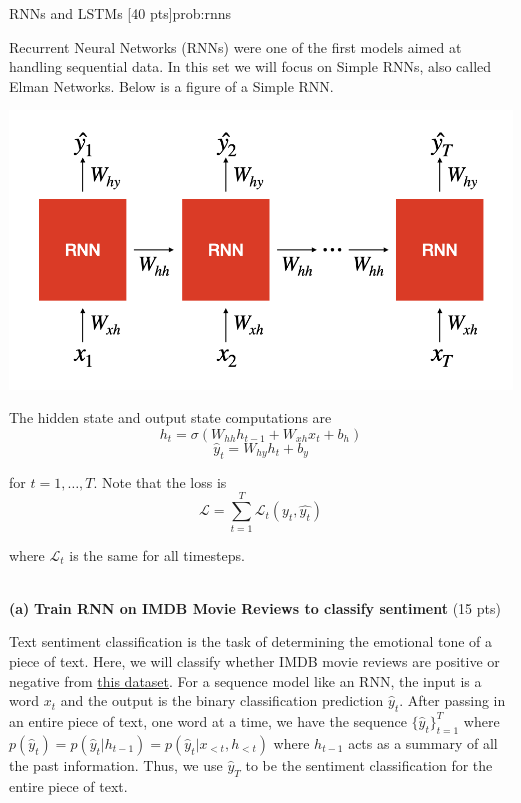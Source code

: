 
\begin{problem}{RNNs and LSTMs \hfill [40 pts]}{prob:rnns}
\label{prob:rnns}

Recurrent Neural Networks (RNNs) were one of the first models aimed at handling sequential data. In this set we will focus on Simple RNNs, also called Elman Networks. Below is a figure of a Simple RNN.

\begin{center}
    \includegraphics[width=0.75\linewidth]{media/rnnfig2.001.png}
\end{center}
    
The hidden state and output state computations are
$$h_t=\sigma(W_{hh}h_{t-1} + W_{xh}x_t + b_h)$$
$$\hat{y}_t = W_{hy}h_t + b_y$$

for $t = 1, \dots, T$. Note that the loss is $$\mathcal{L} = \sum_{t = 1}^T\mathcal{L}_t(y_t, \hat{y_t})$$

where $\mathcal{L}_t$ is the same for all timesteps.
\\
\\
\begin{adjustwidth}{2em}{2em}

    \textbf{(a)} \textbf{Train RNN on IMDB Movie Reviews to classify sentiment} \hfill (15 pts)

    Text sentiment classification is the task of determining the emotional tone of a piece of text. Here, we will classify whether IMDB movie reviews are positive or negative from \href{https://www.kaggle.com/datasets/lakshmi25npathi/imdb-dataset-of-50k-movie-reviews}
    {this dataset}. For a sequence model like an RNN, the input is a word $x_t$ and the output is the binary classification prediction $\hat{y}_t$. After passing in an entire piece of text, one word at a time, we have the sequence $\{\hat{y}_t\}_{t = 1}^T$ where $p(\hat{y}_t) = p(\hat{y}_t | h_{t - 1}) = p(\hat{y}_t | x_{<t}, h_{< t})$ where $h_{t - 1}$ acts as a summary of all the past information. Thus, we use $\hat{y}_T$ to be the sentiment classification for the entire piece of text.


\end{adjustwidth}
\end{problem}
